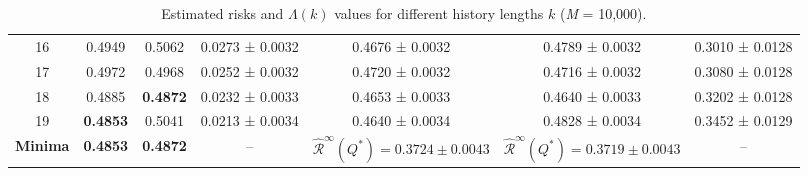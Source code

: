 \documentclass{article}
\begin{document}
\begin{table}[H]
{\begin{tabular}{c c c c c c c}
        16 & 0.4949 & 0.5062 & 0.0273 ± 0.0032 & 0.4676 ± 0.0032 & 0.4789 ± 0.0032 & 0.3010 ± 0.0128 \\
        17 & 0.4972 & 0.4968 & 0.0252 ± 0.0032 & 0.4720 ± 0.0032 & 0.4716 ± 0.0032 & 0.3080 ± 0.0128 \\
        18 & 0.4885 & \textbf{0.4872} & 0.0232 ± 0.0033 & 0.4653 ± 0.0033 & 0.4640 ± 0.0033 & 0.3202 ± 0.0128 \\
        19 & \textbf{0.4853} & 0.5041 & 0.0213 ± 0.0034 & 0.4640 ± 0.0034 & 0.4828 ± 0.0034 & 0.3452 ± 0.0129 \\
        \midrule
        \textbf{Minima} & \textbf{0.4853} & \textbf{0.4872} & -- & $\hat{\mathcal{R}}^\infty(Q^*) = 0.3724 \pm 0.0043$ & $\hat{\mathcal{R}}^\infty(Q^*) = 0.3719 \pm 0.0043$ & -- \\
        \bottomrule
    \end{tabular}
    }
    \caption{Estimated risks and $\Lambda(k)$ values for different history lengths $k$ (\textit{M} = 10{,}000).}
    \label{tab:universal_learning_1}
\end{table}
\end{document}
